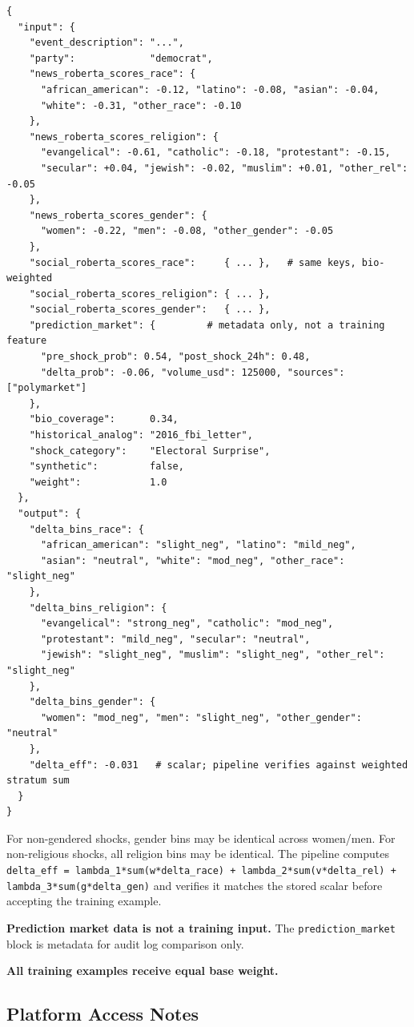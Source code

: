 \documentclass[11pt]{article}
\begin{document}
\begin{lstlisting}
{
  "input": {
    "event_description": "...",
    "party":             "democrat",
    "news_roberta_scores_race": {
      "african_american": -0.12, "latino": -0.08, "asian": -0.04,
      "white": -0.31, "other_race": -0.10
    },
    "news_roberta_scores_religion": {
      "evangelical": -0.61, "catholic": -0.18, "protestant": -0.15,
      "secular": +0.04, "jewish": -0.02, "muslim": +0.01, "other_rel": -0.05
    },
    "news_roberta_scores_gender": {
      "women": -0.22, "men": -0.08, "other_gender": -0.05
    },
    "social_roberta_scores_race":     { ... },   # same keys, bio-weighted
    "social_roberta_scores_religion": { ... },
    "social_roberta_scores_gender":   { ... },
    "prediction_market": {         # metadata only, not a training feature
      "pre_shock_prob": 0.54, "post_shock_24h": 0.48,
      "delta_prob": -0.06, "volume_usd": 125000, "sources": ["polymarket"]
    },
    "bio_coverage":      0.34,
    "historical_analog": "2016_fbi_letter",
    "shock_category":    "Electoral Surprise",
    "synthetic":         false,
    "weight":            1.0
  },
  "output": {
    "delta_bins_race": {
      "african_american": "slight_neg", "latino": "mild_neg",
      "asian": "neutral", "white": "mod_neg", "other_race": "slight_neg"
    },
    "delta_bins_religion": {
      "evangelical": "strong_neg", "catholic": "mod_neg",
      "protestant": "mild_neg", "secular": "neutral",
      "jewish": "slight_neg", "muslim": "slight_neg", "other_rel": "slight_neg"
    },
    "delta_bins_gender": {
      "women": "mod_neg", "men": "slight_neg", "other_gender": "neutral"
    },
    "delta_eff": -0.031   # scalar; pipeline verifies against weighted stratum sum
  }
}
\end{lstlisting}

\noindent For non-gendered shocks, gender bins may be identical across women/men.
For non-religious shocks, all religion bins may be identical.
The pipeline computes \texttt{delta\_eff = lambda\_1*sum(w*delta\_race)
+ lambda\_2*sum(v*delta\_rel) + lambda\_3*sum(g*delta\_gen)} and verifies
it matches the stored scalar before accepting the training example.

\noindent\textbf{Prediction market data is not a training input.}
The \texttt{prediction\_market} block is metadata for audit log comparison only.

\noindent\textbf{All training examples receive equal base weight.}

\subsection*{Platform Access Notes}
\end{document}
